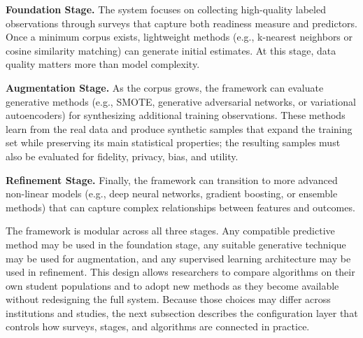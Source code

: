 \documentclass[letterpaper,11pt]{article}
\begin{document}
\textbf{Foundation Stage.} The system focuses on collecting high-quality labeled observations through surveys that capture both readiness measure and predictors. Once a minimum corpus exists, lightweight methods (e.g., k-nearest neighbors or cosine similarity matching) can generate initial estimates. At this stage, data quality matters more than model complexity.

\textbf{Augmentation Stage.} As the corpus grows, the framework can evaluate generative methods (e.g., SMOTE, generative adversarial networks, or variational autoencoders) for synthesizing additional training observations. These methods learn from the real data and produce synthetic samples that expand the training set while preserving its main statistical properties; the resulting samples must also be evaluated for fidelity, privacy, bias, and utility.

\textbf{Refinement Stage.} Finally, the framework can transition to more advanced non-linear models (e.g., deep neural networks, gradient boosting, or ensemble methods) that can capture complex relationships between features and outcomes.

The framework is modular across all three stages. Any compatible predictive method may be used in the foundation stage, any suitable generative technique may be used for augmentation, and any supervised learning architecture may be used in refinement. This design allows researchers to compare algorithms on their own student populations and to adopt new methods as they become available without redesigning the full system. Because those choices may differ across institutions and studies, the next subsection describes the configuration layer that controls how surveys, stages, and algorithms are connected in practice.
\end{document}
